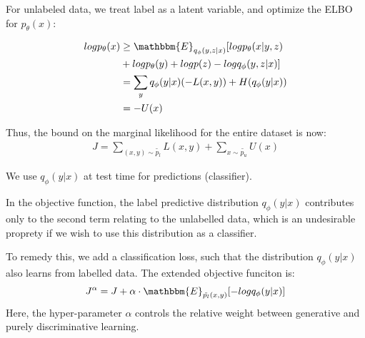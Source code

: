 \documentclass{beamer}
\let\tempone\itemize
\let\temptwo\enditemize
\renewenvironment{itemize}{\tempone\addtolength{\itemsep}{0.5\baselineskip}}{\temptwo}
\newcommand{\E}{\mathbbm{E}}
\begin{document}
\begin{frame}
  \begin{center}
      \begin{itemize}
       
        \item For unlabeled data, we treat label as a latent variable, and optimize the ELBO for $p_{\theta}(x)$:

        \begin{align}
          log p_{\theta}(x) &\geq \E_{q_{\phi}(y,z|x)}[log p_{\theta}(x|y,z)\\ &+ log p_{\theta}(y) + log p(z) - log q_{\phi}(y,z|x)]\\
            &= \sum_{y} q_{\phi}(y|x)(-L(x,y)) + H(q_{\phi}(y|x))\\ &= -U(x)
        \end{align}
        \item Thus, the bound on the marginal likelihood for the entire dataset is now:\\
          \begin{align}
            J = \sum_{(x,y) \sim \tilde{p_l}}L(x,y) + \sum_{x \sim \tilde{p_u}}U(x)
          \end{align} 
        \end{itemize}
  \end{center}
\end{frame}

\begin{frame}
  \begin{center}
    \begin{itemize}
      \item We use $q_{\phi}(y|x)$ at test time for predictions (classifier).
      \item In the objective function, the label predictive distribution $q_{\phi}(y|x)$ contributes only to the second term 
      relating to the unlabelled data, which is an undesirable proprety if we wish to use this distribution as a classifier.\\
      \item To remedy this, we add a classification loss, such that the distribution $q_{\phi}(y|x)$ also learns from labelled data. The extended objective funciton is:
        \begin{align}
          J^{\alpha} = J + \alpha \cdot \E_{\tilde{p_l}(x,y)}[-log q_{\phi}(y|x)]
        \end{align}
        Here, the hyper-parameter $\alpha$ controls the relative weight between generative and purely discriminative learning.
    \end{itemize}
  \end{center}
\end{frame}
\end{document}
